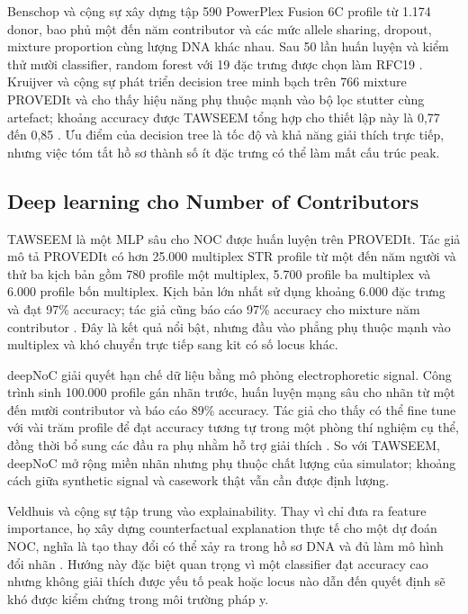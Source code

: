 \documentclass[12pt,a4paper]{article}
\begin{document}
Benschop và cộng sự xây dựng tập 590 PowerPlex Fusion 6C profile từ 1.174 donor, bao phủ một đến năm contributor và các mức allele sharing, dropout, mixture proportion cùng lượng DNA khác nhau. Sau 50 lần huấn luyện và kiểm thử mười classifier, random forest với 19 đặc trưng được chọn làm RFC19 \cite{benschop2019,alamoudi2022}. Kruijver và cộng sự phát triển decision tree minh bạch trên 766 mixture PROVEDIt và cho thấy hiệu năng phụ thuộc mạnh vào bộ lọc stutter cùng artefact; khoảng accuracy được TAWSEEM tổng hợp cho thiết lập này là 0,77 đến 0,85 \cite{kruijver2021,alamoudi2022}. Ưu điểm của decision tree là tốc độ và khả năng giải thích trực tiếp, nhưng việc tóm tắt hồ sơ thành số ít đặc trưng có thể làm mất cấu trúc peak.


\subsection{Deep learning cho Number of Contributors}

TAWSEEM là một MLP sâu cho NOC được huấn luyện trên PROVEDIt. Tác giả mô tả PROVEDIt có hơn 25.000 multiplex STR profile từ một đến năm người và thử ba kịch bản gồm 780 profile một multiplex, 5.700 profile ba multiplex và 6.000 profile bốn multiplex. Kịch bản lớn nhất sử dụng khoảng 6.000 đặc trưng và đạt 97\% accuracy; tác giả cũng báo cáo 97\% accuracy cho mixture năm contributor \cite{alamoudi2022}. Đây là kết quả nổi bật, nhưng đầu vào phẳng phụ thuộc mạnh vào multiplex và khó chuyển trực tiếp sang kit có số locus khác.

deepNoC giải quyết hạn chế dữ liệu bằng mô phỏng electrophoretic signal. Công trình sinh 100.000 profile gán nhãn trước, huấn luyện mạng sâu cho nhãn từ một đến mười contributor và báo cáo 89\% accuracy. Tác giả cho thấy có thể fine tune với vài trăm profile để đạt accuracy tương tự trong một phòng thí nghiệm cụ thể, đồng thời bổ sung các đầu ra phụ nhằm hỗ trợ giải thích \cite{taylor2024deepnoc}. So với TAWSEEM, deepNoC mở rộng miền nhãn nhưng phụ thuộc chất lượng của simulator; khoảng cách giữa synthetic signal và casework thật vẫn cần được định lượng.


Veldhuis và cộng sự tập trung vào explainability. Thay vì chỉ đưa ra feature importance, họ xây dựng counterfactual explanation thực tế cho một dự đoán NOC, nghĩa là tạo thay đổi có thể xảy ra trong hồ sơ DNA và đủ làm mô hình đổi nhãn \cite{veldhuis2022}. Hướng này đặc biệt quan trọng vì một classifier đạt accuracy cao nhưng không giải thích được yếu tố peak hoặc locus nào dẫn đến quyết định sẽ khó được kiểm chứng trong môi trường pháp y.
\end{document}
